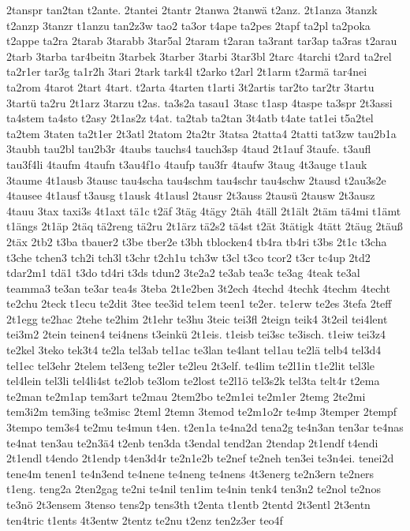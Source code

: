 {2tanspr
tan2tan
t2ante.
2tantei
2tantr
2tanwa
2tanwä
t2anz.
2t1anza
3tanzk
t2anzp
3tanzr
t1anzu
tan2z3w
tao2
ta3or
t4ape
ta2pes
2tapf
ta2pl
ta2poka
t2appe
ta2ra
2tarab
3tarabb
3tar5al
2taram
t2aran
ta3rant
tar3ap
ta3ras
t2arau
2tarb
3tarba
tar4beitn
3tarbek
3tarber
3tarbi
3tar3bl
2tarc
4tarchi
t2ard
ta2rel
ta2r1er
tar3g
ta1r2h
3tari
2tark
tark4l
t2arko
t2arl
2t1arm
t2armä
tar4nei
ta2rom
4tarot
2tart
4tart.
t2arta
4tarten
t1arti
3t2artis
tar2to
tar2tr
3tartu
3tartü
ta2ru
2t1arz
3tarzu
t2as.
ta3s2a
tasau1
3tasc
t1asp
4taspe
ta3spr
2t3assi
ta4stem
ta4sto
t2asy
2t1as2z
t4at.
ta2tab
ta2tan
3t4atb
t4ate
tat1ei
t5a2tel
ta2tem
3taten
ta2t1er
2t3atl
2tatom
2ta2tr
3tatsa
2tatta4
2tatti
tat3zw
tau2b1a
3taubh
tau2bl
tau2b3r
4taubs
tauchs4
tauch3sp
4taud
2t1auf
3taufe.
t3aufl
tau3f4li
4taufm
4taufn
t3au4f1o
4taufp
tau3fr
4taufw
3taug
4t3auge
t1auk
3taume
4t1ausb
3tausc
tau4scha
tau4schm
tau4schr
tau4schw
2tausd
t2au3s2e
4tausee
4t1ausf
t3ausg
t1ausk
4t1ausl
2tausr
2t3auss
2tausü
2tausw
2t3ausz
4tauu
3tax
taxi3s
4t1axt
tä1c
t2äf
3täg
4tägy
2täh
4täll
2t1ält
2täm
tä4mi
t1ämt
t1ängs
2t1äp
2täq
tä2reng
tä2ru
2t1ärz
tä2s2
tä4st
t2ät
3tätigk
4tätt
2täug
2täuß
2täx
2tb2
t3ba
tbauer2
t3be
tber2e
t3bh
tblocken4
tb4ra
tb4ri
t3bs
2t1c
t3cha
t3che
tchen3
tch2i
tch3l
t3chr
t2ch1u
tch3w
t3cl
t3co
tcor2
t3cr
tc4up
2td2
tdar2m1
tdä1
t3do
td4ri
t3ds
tdun2
3te2a2
te3ab
tea3c
te3ag
4teak
te3al
teamma3
te3an
te3ar
tea4s
3teba
2t1e2ben
3t2ech
4techd
4techk
4techm
4techt
te2chu
2teck
t1ecu
te2dit
3tee
tee3id
te1em
teen1
te2er.
te1erw
te2es
3tefa
2teff
2t1egg
te2hac
2tehe
te2him
2t1ehr
te3hu
3teic
tei3fl
2teign
teik4
3t2eil
tei4lent
tei3m2
2tein
teinen4
tei4nens
t3einkü
2t1eis.
t1eisb
tei3sc
te3isch.
t1eiw
tei3z4
te2kel
3teko
tek3t4
te2la
tel3ab
tel1ac
te3lan
te4lant
tel1au
te2lä
telb4
tel3d4
tel1ec
tel3ehr
2telem
tel3eng
te2ler
te2leu
2t3elf.
te4lim
te2l1in
t1e2lit
tel3le
tel4lein
tel3li
tel4li4st
te2lob
te3lom
te2lost
te2l1ö
tel3s2k
tel3ta
telt4r
t2ema
te2man
te2m1ap
tem3art
te2mau
2tem2bo
te2m1ei
te2m1er
2temg
2te2mi
tem3i2m
tem3ing
te3misc
2teml
2temn
3temod
te2m1o2r
te4mp
3temper
2tempf
3tempo
tem3s4
te2mu
te4mun
t4en.
t2en1a
te4na2d
tena2g
te4n3an
ten3ar
te4nas
te4nat
ten3au
te2n3ä4
t2enb
ten3da
t3endal
tend2an
2tendap
2t1endf
t4endi
2t1endl
t4endo
2t1endp
t4en3d4r
te2n1e2b
te2nef
te2neh
ten3ei
te3n4ei.
tenei2d
tene4m
tenen1
te4n3end
te4nene
te4neng
te4nens
4t3energ
te2n3ern
te2ners
t1eng.
teng2a
2ten2gag
te2ni
te4nil
ten1im
te4nin
tenk4
ten3n2
te2nol
te2nos
te3nö
2t3ensem
3tenso
tens2p
tens3th
t2enta
t1entb
2tentd
2t3entl
2t3entn
ten4tric
t1ents
4t3entw
2tentz
te2nu
t2enz
ten2z3er
teo4f
}

